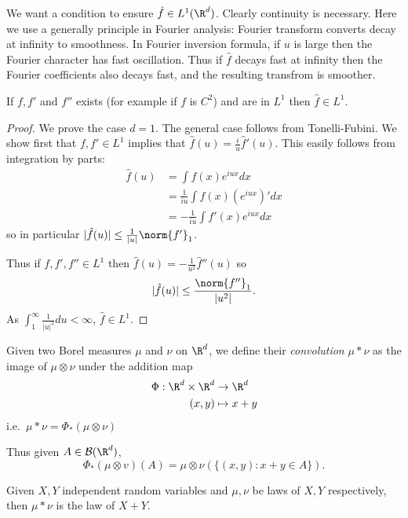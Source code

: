 \documentclass[a4paper]{article}
\begin{document}
We want a condition to ensure \(\hat f \in L^1(\R^d)\). Clearly continuity is necessary. Here we use a generally principle in Fourier analysis: Fourier transform converts decay at infinity to smoothness. In Fourier inversion formula, if \(u\) is large then the Fourier character has fast oscillation. Thus if \(\hat f\) decays fast at infinity then the Fourier coefficients also decays fast, and the resulting transfrom is smoother.

\begin{proposition}
  If \(f, f'\) and \(f''\) exists (for example if \(f\) is \(C^2\)) and are in \(L^1\) then \(\hat f \in L^1\).
\end{proposition}

\begin{proof}
  We prove the case \(d = 1\). The general case follows from Tonelli-Fubini. We show first that \(f, f' \in L^1\) implies that \(\hat f(u) = \frac{i}{u} \hat f'(u)\). This easily follows from integration by parts:
  \begin{align*}
    \hat f(u)
    &= \int f(x) e^{iux} dx \\
    &= \frac{1}{iu} \int f(x) (e^{iux})' dx \\
    &= -\frac{1}{iu} \int f'(x) e^{iux} dx
  \end{align*}
  so in particular \(|\hat f(u)| \leq \frac{1}{|u|} \norm{f'}_1\).

  Thus if \(f, f', f'' \in L^1\) then \(\hat f(u) = - \frac{1}{u^2} \hat f''(u)\) so
  \[
    |\hat f(u)| \leq \frac{\norm{f''}_1}{|u^2|}.
  \]
  As \(\int_1^\infty \frac{1}{|u|^2} du < \infty\), \(\hat f \in L^1\).
\end{proof}

\begin{definition}[convolution]
  Given two Borel measures \(\mu\) and \(\nu\) on \(\R^d\), we define their \emph{convolution} \(\mu * \nu\) as the image of \(\mu \otimes \nu\) under the addition map
  \begin{align*}
    \Phi: \R^d \times \R^d &\to \R^d \\
    (x, y) &\mapsto x + y
  \end{align*}
  i.e.\ \(\mu * \nu = \Phi_*(\mu \otimes \nu)\)
\end{definition}

Thus given \(A \in \mathcal B(\R^d)\),
\[
  \Phi_*(\mu \otimes v)(A) = \mu \otimes \nu (\{(x, y): x + y \in A\}).
\]

\begin{eg}
  Given \(X, Y\) independent random variables and \(\mu, \nu\) be laws of \(X, Y\) respectively, then \(\mu * \nu\) is the law of \(X + Y\).
\end{eg}
\end{document}
